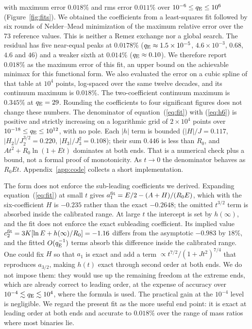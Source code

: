 \documentclass[twocolumn]{aastex702}
\newcommand{\qE}{q_{\rm E}}
\begin{document}
with maximum error $0.018\%$ and rms error $0.011\%$ over $10^{-6}\le\qE\le10^6$ (Figure~\ref{fig:fits}). We obtained the coefficients from a least-squares fit followed by six rounds of Nelder--Mead minimization of the maximum relative error over the 73 reference values. This is neither a Remez exchange nor a global search. The residual has five near-equal peaks at $0.0178\%$ ($\qE\approx1.5\times10^{-5}$, $4.6\times10^{-3}$, $0.68$, $4.6$ and $46$) and a weaker sixth at $0.014\%$ ($\qE\approx0.10$). We therefore report $0.018\%$ as the maximum error of this fit, an upper bound on the achievable minimax for this functional form. We also evaluated the error on a cubic spline of that table at $10^4$ points, log-spaced over the same twelve decades, and its continuum maximum is $0.018\%$. The two-coefficient continuum maximum is $0.345\%$ at $\qE=29$. Rounding the coefficients to four significant figures does not change these numbers. The denominator of equation~(\ref{eq:fit}) with (\ref{eq:h6}) is positive and strictly increasing on a logarithmic grid of $2\times10^4$ points over $10^{-18}\le\qE\le10^{12}$, with no pole. Each $|h|$ term is bounded ($|H|/J=0.117$, $|H_2|/J_2^{3/2}=0.220$, $|H_3|/J_3^2=0.108$); their sum $0.446$ is less than $R_0$, and $At^2+R_0\ln(1+Et)$ dominates at both ends. That is a numerical check plus a bound, not a formal proof of monotonicity. As $t\to0$ the denominator behaves as $R_0 E t$. Appendix~\ref{app:code} collects a short implementation.

The form does not enforce the sub-leading coefficients we derived. Expanding equation~(\ref{eq:fit}) at small $t$ gives $a_1^{\rm fit}=E/2-(A+H)/(R_0 E)$, which with the six-coefficient $H$ is $-0.235$ rather than the exact $-0.2648$; the omitted $t^{3/2}$ term is absorbed inside the calibrated range. At large $t$ the intercept is set by $h(\infty)$, and the fit does not enforce the exact subleading coefficient. Its implied value $c_2^{\rm fit}=3K[\ln E+h(\infty)/R_0]=-1.16$ differs from the asymptotic $-0.983$ by $18\%$, and the fitted $O(\qE^{-1})$ terms absorb this difference inside the calibrated range. One could fix $H$ so that $a_1$ is exact and add a term $\propto t^{7/2}/(1+Jt^2)^{7/4}$ that reproduces $a_{3/2}$, making $h(t)$ exact through second order at both ends. We do not impose them: they would use up the remaining freedom at the extreme ends, which are already correct to leading order, at the expense of accuracy over $10^{-4}\lesssim\qE\lesssim10^4$, where the formula is used. The practical gain at the $10^{-4}$ level is negligible. We regard the present fit as the more useful end point: it is exact at leading order at both ends and accurate to $0.018\%$ over the range of mass ratios where most binaries lie.
\end{document}
